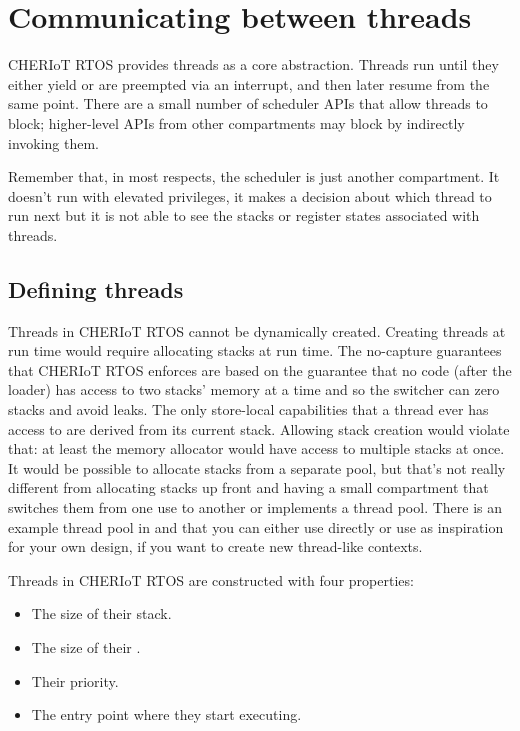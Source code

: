 \chapter[label=threads]{Communicating between threads}

CHERIoT RTOS provides threads as a core abstraction.
Threads run until they either yield or are preempted via an interrupt, and then later resume from the same point.
There are a small number of scheduler APIs that allow threads to block; higher-level APIs from other compartments may block by indirectly invoking them.

Remember that, in most respects, the scheduler is just another compartment.
It doesn't run with elevated privileges, it makes a decision about which thread to run next but it is not able to see the stacks or register states associated with threads.

\section{Defining threads}

Threads in CHERIoT RTOS cannot be dynamically created.
Creating threads at run time would require allocating stacks at run time.
The no-capture guarantees that CHERIoT RTOS enforces are based on the guarantee that no code (after the loader) has access to two stacks' memory at a time and so the switcher can zero stacks and avoid leaks.
The only store-local capabilities that a thread ever has access to are derived from its current stack.
Allowing stack creation would violate that: at least the memory allocator would have access to multiple stacks at once.
It would be possible to allocate stacks from a separate pool, but that's not really different from allocating stacks up front and having a small compartment that switches them from one use to another or implements a thread pool.
There is an example thread pool in  and  that you can either use directly or use as inspiration for your own design, if you want to create new thread-like contexts.

Threads in CHERIoT RTOS are constructed with four properties:

\begin{itemize}
	\item{The size of their stack.}
	\item{The size of their .}
	\item{Their priority.}
	\item{The entry point where they start executing.}
\end{itemize}

